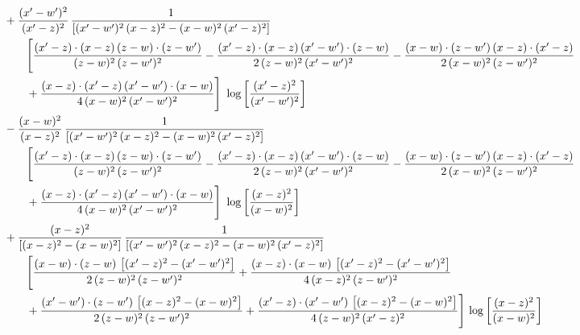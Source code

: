 \documentclass[10pt]{article}
\begin{document}
\begin{align}
&\qquad+\frac{(x^{\prime}-w^{\prime})^{2}}{(x^{\prime}-z)^{2}}\, \frac{1}{\left[(x^{\prime}-w^{\prime})^{2}\, (x-z)^{2} - (x-w)^{2}\, (x^{\prime}-z)^{2}\right]} \notag\\&\qquad\qquad  \Bigg[\frac{(x^{\prime}-z)\cdot (x-z)\, (z-w)\cdot (z-w^{\prime})}{(z-w)^{2}\, (z-w^{\prime})^{2}}-\frac{(x^{\prime}-z)\cdot (x-z)\, (x^{\prime}-w^{\prime})\cdot (z-w)}{2\, (z-w)^{2}\, (x^{\prime}-w^{\prime})^{2}} -\frac{(x-w)\cdot (z-w^{\prime})\, (x-z)\cdot (x^{\prime}-z)}{2\, (x-w)^{2}\, (z-w^{\prime})^{2}}\notag\\&\qquad\qquad  +\frac{(x-z)\cdot (x^{\prime}-z)\, (x^{\prime}-w^{\prime})\cdot (x-w)}{4\, (x-w)^{2}\, (x^{\prime}-w^{\prime})^{2}}\Bigg]\,\, \log{\left[\frac{(x^{\prime}-z)^{2}}{(x^{\prime}-w^{\prime})^{2}}\right]}\notag\\
&\qquad-\frac{(x-w)^{2}}{(x-z)^{2}}\, \frac{1}{\left[(x^{\prime}-w^{\prime})^{2}\, (x-z)^{2} - (x-w)^{2}\, (x^{\prime}-z)^{2}\right]} \notag\\&\qquad\qquad  \Bigg[\frac{(x^{\prime}-z)\cdot (x-z)\, (z-w)\cdot (z-w^{\prime})}{(z-w)^{2}\, (z-w^{\prime})^{2}}-\frac{(x^{\prime}-z)\cdot (x-z)\, (x^{\prime}-w^{\prime})\cdot (z-w)}{2\, (z-w)^{2}\, (x^{\prime}-w^{\prime})^{2}} -\frac{(x-w)\cdot (z-w^{\prime})\, (x-z)\cdot (x^{\prime}-z)}{2\, (x-w)^{2}\, (z-w^{\prime})^{2}}\notag\\&\qquad\qquad  +\frac{(x-z)\cdot (x^{\prime}-z)\, (x^{\prime}-w^{\prime})\cdot (x-w)}{4\, (x-w)^{2}\, (x^{\prime}-w^{\prime})^{2}}\Bigg]\,\, \log{\left[\frac{(x-z)^{2}}{(x-w)^{2}}\right]}\notag\\
&\qquad+\frac{(x-z)^{2}}{\left[(x-z)^{2}-(x-w)^{2}\right]}\,\frac{1}{\left[(x^{\prime}-w^{\prime})^{2}\,(x-z)^{2} - (x-w)^{2}\,(x^{\prime}-z)^{2}\right]}\notag\\&\qquad\qquad  \Bigg[\frac{(x-w)\cdot (z-w)\, \left[(x^{\prime}-z)^{2}-(x^{\prime}-w^{\prime})^{2}\right]}{2\, (z-w)^{2}\, (z-w^{\prime})^{2}}  + \frac{(x-z)\cdot (x-w)\,\left[(x^{\prime}-z)^{2}-(x^{\prime}-w^{\prime})^{2}\right] }{4\,(x-z)^{2}\,(z-w^{\prime})^{2}}\notag\\&\qquad\qquad  +\frac{(x^{\prime}-w^{\prime})\cdot (z-w^{\prime})\, \left[(x-z)^{2}-(x-w)^{2}\right]}{2\, (z-w)^{2}\, (z-w^{\prime})^{2}}+ \frac{(x^{\prime}-z)\cdot (x^{\prime}-w^{\prime})\, \left[(x-z)^{2}-(x-w)^{2}\right]}{4\, (z-w)^{2}\,(x^{\prime}-z)^{2}}\Bigg]\, \log{\left[\frac{(x-z)^{2}}{(x-w)^{2}}\right]}\notag\\

\end{align}
\end{document}
